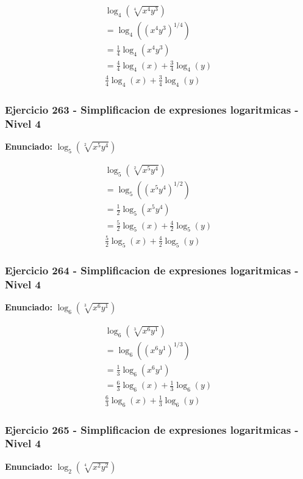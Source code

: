\documentclass[12pt,a4paper]{article}
\begin{document}
\[
\begin{aligned}
\log_{4}\left(\sqrt[4]{x^{4}y^{3}}\right)\\
=\log_{4}\left((x^{4}y^{3})^{1/4}\right)\\
=\frac{1}{4}\log_{4}\left(x^{4}y^{3}\right) \\
=\frac{4}{4}\log_{4}\left(x\right)+\frac{3}{4}\log_{4}\left(y\right)\\
\boxed{\frac{4}{4}\log_{4}\left(x\right)+\frac{3}{4}\log_{4}\left(y\right)}
\end{aligned}
\]


\subsubsection*{Ejercicio 263 - Simplificacion de expresiones logaritmicas - Nivel 4}
\textbf{Enunciado:} \(\log_{5}\left(\sqrt[2]{x^{5}y^{4}}\right)\)

\[
\begin{aligned}
\log_{5}\left(\sqrt[2]{x^{5}y^{4}}\right)\\
=\log_{5}\left((x^{5}y^{4})^{1/2}\right)\\
=\frac{1}{2}\log_{5}\left(x^{5}y^{4}\right) \\
=\frac{5}{2}\log_{5}\left(x\right)+\frac{4}{2}\log_{5}\left(y\right)\\
\boxed{\frac{5}{2}\log_{5}\left(x\right)+\frac{4}{2}\log_{5}\left(y\right)}
\end{aligned}
\]


\subsubsection*{Ejercicio 264 - Simplificacion de expresiones logaritmicas - Nivel 4}
\textbf{Enunciado:} \(\log_{6}\left(\sqrt[3]{x^{6}y^{1}}\right)\)

\[
\begin{aligned}
\log_{6}\left(\sqrt[3]{x^{6}y^{1}}\right)\\
=\log_{6}\left((x^{6}y^{1})^{1/3}\right)\\
=\frac{1}{3}\log_{6}\left(x^{6}y^{1}\right) \\
=\frac{6}{3}\log_{6}\left(x\right)+\frac{1}{3}\log_{6}\left(y\right)\\
\boxed{\frac{6}{3}\log_{6}\left(x\right)+\frac{1}{3}\log_{6}\left(y\right)}
\end{aligned}
\]


\subsubsection*{Ejercicio 265 - Simplificacion de expresiones logaritmicas - Nivel 4}
\textbf{Enunciado:} \(\log_{2}\left(\sqrt[4]{x^{2}y^{2}}\right)\)
\end{document}
